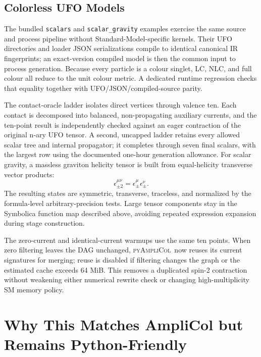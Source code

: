 \documentclass[10pt]{article}
\newcommand{\PAC}{\textsc{pyAmpliCol}}
\begin{document}
\clearpage
\begin{landscape}
\section{Colorless UFO Models}

The bundled \texttt{scalars} and \texttt{scalar\_gravity} examples exercise the
same source and process pipeline without Standard-Model-specific kernels.
Their UFO directories and loader JSON serializations compile to identical
canonical IR fingerprints; an exact-version compiled model is then the common
input to process generation.  Because every particle is a colour singlet, LC,
NLC, and full colour all reduce to the unit colour metric.  A dedicated runtime
regression checks that equality together with UFO/JSON/compiled-source parity.

The contact-oracle ladder isolates direct vertices through valence ten. Each
contact is decomposed into balanced, non-propagating auxiliary currents, and
the ten-point result is independently checked against an eager contraction of
the original n-ary UFO tensor. A second, uncapped ladder retains every allowed
scalar tree and internal propagator; it completes through seven final scalars,
with the largest row using the documented one-hour generation allowance. For
scalar gravity, a massless graviton helicity tensor is built from equal-helicity
transverse vector products:
\[
  \epsilon^{\mu\nu}_{\pm2}=\epsilon^\mu_\pm\epsilon^\nu_\pm .
\]
The resulting states are symmetric, transverse, traceless, and normalized by
the formula-level arbitrary-precision tests.  Large tensor components stay in
the Symbolica function map described above, avoiding repeated expression
expansion during stage construction.

The zero-current and identical-current warmups use the same ten points.  When
zero filtering leaves the DAG unchanged, \PAC\ now reuses its current
signatures for merging; reuse is disabled if filtering changes the graph or
the estimated cache exceeds 64 MiB.  This removes a duplicated spin-2
contraction without weakening either numerical rewrite check or changing
high-multiplicity SM memory policy.


\clearpage


\end{landscape}


\section{Why This Matches AmpliCol but Remains Python-Friendly}
\end{document}
